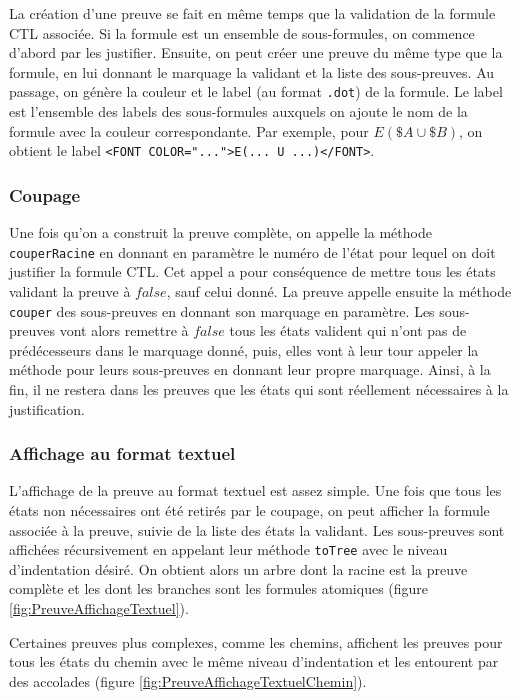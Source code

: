\documentclass[dvipsnames]{report}
\begin{document}
La création d'une preuve se fait en même temps que la validation de la formule CTL associée. Si la formule est un ensemble de sous-formules, on commence d'abord par les justifier. Ensuite, on peut créer une preuve du même type que la formule, en lui donnant le marquage la validant et la liste des sous-preuves. Au passage, on génère la couleur et le label (au format \texttt{.dot}) de la formule. Le label est l'ensemble des labels des sous-formules auxquels on ajoute le nom de la formule avec la couleur correspondante. Par exemple, pour $E(\$A \cup \$B)$, on obtient le label \texttt{<FONT COLOR="...">E(... U ...)</FONT>}.

\subsubsection{Coupage}

Une fois qu'on a construit la preuve complète, on appelle la méthode \texttt{couperRacine} en donnant en paramètre le numéro de l'état pour lequel on doit justifier la formule CTL. Cet appel a pour conséquence de mettre tous les états validant la preuve à $false$, sauf celui donné. La preuve appelle ensuite la méthode \texttt{couper} des sous-preuves en donnant son marquage en paramètre. Les sous-preuves vont alors remettre à $false$ tous les états valident qui n'ont pas de prédécesseurs dans le marquage donné, puis, elles vont à leur tour appeler la méthode pour leurs sous-preuves en donnant leur propre marquage. Ainsi, à la fin, il ne restera dans les preuves que les états qui sont réellement nécessaires à la justification.

\subsubsection{Affichage au format textuel}

L'affichage de la preuve au format textuel est assez simple. Une fois que tous les états non nécessaires ont été retirés par le coupage, on peut afficher la formule associée à la preuve, suivie de la liste des états la validant. Les sous-preuves sont affichées récursivement en appelant leur méthode \texttt{toTree} avec le niveau d'indentation désiré. On obtient alors un arbre dont la racine est la preuve complète et les dont les branches sont les formules atomiques (figure \ref{fig:PreuveAffichageTextuel}).



Certaines preuves plus complexes, comme les chemins, affichent les preuves pour tous les états du chemin avec le même niveau d'indentation et les entourent par des accolades (figure \ref{fig:PreuveAffichageTextuelChemin}).
\end{document}
